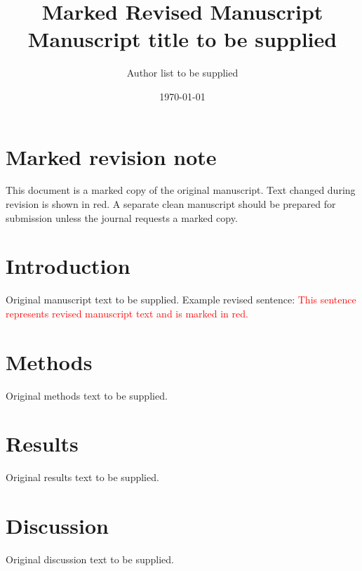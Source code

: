 \documentclass[11pt]{article}
\title{Marked Revised Manuscript\\
\large Manuscript title to be supplied}
\author{Author list to be supplied}
\date{\today}
\newcommand{\revised}[1]{\textcolor{red}{#1}}
\begin{document}
\maketitle

\section*{Marked revision note}

This document is a marked copy of the original manuscript. Text changed during
revision is shown in red. A separate clean manuscript should be prepared for
submission unless the journal requests a marked copy.

\section{Introduction}

Original manuscript text to be supplied. Example revised sentence:
\revised{This sentence represents revised manuscript text and is marked in red.}

\section{Methods}

Original methods text to be supplied.

\section{Results}

Original results text to be supplied.

\section{Discussion}

Original discussion text to be supplied.
\end{document}
